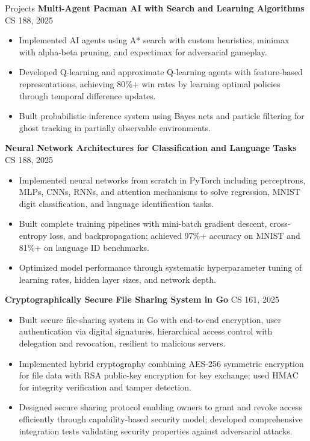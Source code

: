 \documentclass{resume}
\begin{document}
\begin{rSection}{Projects}
\textbf{Multi-Agent Pacman AI with Search and Learning Algorithms} \hfill CS 188, 2025
\begin{itemize}
  \item Implemented AI agents using A* search with custom heuristics, minimax with alpha-beta pruning, and expectimax for adversarial gameplay.
  \item Developed Q-learning and approximate Q-learning agents with feature-based representations, achieving 80\%+ win rates by learning optimal policies through temporal difference updates.
  \item Built probabilistic inference system using Bayes nets and particle filtering for ghost tracking in partially observable environments.
\end{itemize}

\textbf{Neural Network Architectures for Classification and Language Tasks} \hfill CS 188, 2025
\begin{itemize}
  \item Implemented neural networks from scratch in PyTorch including perceptrons, MLPs, CNNs, RNNs, and attention mechanisms to solve regression, MNIST digit classification, and language identification tasks.
  \item Built complete training pipelines with mini-batch gradient descent, cross-entropy loss, and backpropagation; achieved 97\%+ accuracy on MNIST and 81\%+ on language ID benchmarks.
  \item Optimized model performance through systematic hyperparameter tuning of learning rates, hidden layer sizes, and network depth.
\end{itemize}

\textbf{Cryptographically Secure File Sharing System in Go} \hfill CS 161, 2025
\begin{itemize}
  \item Built secure file-sharing system in Go with end-to-end encryption, user authentication via digital signatures, hierarchical access control with delegation and revocation, resilient to malicious servers.
  \item Implemented hybrid cryptography combining AES-256 symmetric encryption for file data with RSA public-key encryption for key exchange; used HMAC for integrity verification and tamper detection.
  \item Designed secure sharing protocol enabling owners to grant and revoke access efficiently through capability-based security model; developed comprehensive integration tests validating security properties against adversarial attacks.
\end{itemize}


\end{rSection}
\end{document}
